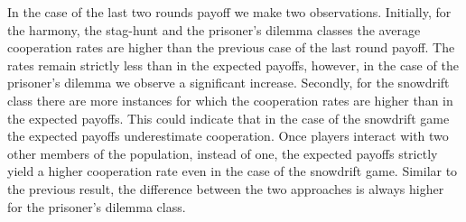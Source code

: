 \documentclass[11pt]{article}
\theoremstyle{plainCl1}
\theoremstyle{plainCl2}
\begin{document}
In the case of the last two rounds payoff we make two observations. Initially,
for the harmony, the stag-hunt and the prisoner's dilemma classes the average
cooperation rates are higher than the previous case of the last round payoff.
The rates remain strictly less than in the expected payoffs, however, in the
case of the prisoner's dilemma we observe a significant increase. Secondly, for
the snowdrift class there are more instances for which the cooperation rates are
higher than in the expected payoffs. This could indicate that in the case of the
snowdrift game the expected payoffs underestimate cooperation.
Once players interact with two other members of the population, instead of one,
the expected payoffs strictly yield a higher cooperation rate  even in the case
of the snowdrift game. Similar to the previous result, the difference between
the two approaches is always higher for the prisoner's dilemma class.
\end{document}
